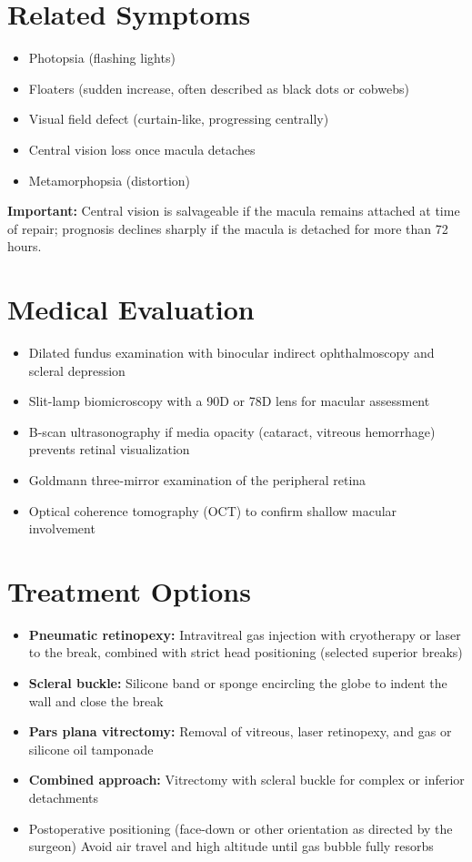 \section*{Related Symptoms}
\begin{itemize}
  \item Photopsia (flashing lights)
  \item Floaters (sudden increase, often described as black dots or cobwebs)
  \item Visual field defect (curtain-like, progressing centrally)
  \item Central vision loss once macula detaches
  \item Metamorphopsia (distortion)
\end{itemize}
\textbf{Important:} Central vision is salvageable if the macula remains attached at time of repair; prognosis declines sharply if the macula is detached for more than 72 hours.

\section*{Medical Evaluation}
\begin{itemize}
  \item Dilated fundus examination with binocular indirect ophthalmoscopy and scleral depression
  \item Slit-lamp biomicroscopy with a 90D or 78D lens for macular assessment
  \item B-scan ultrasonography if media opacity (cataract, vitreous hemorrhage) prevents retinal visualization
  \item Goldmann three-mirror examination of the peripheral retina
  \item Optical coherence tomography (OCT) to confirm shallow macular involvement
\end{itemize}

\section*{Treatment Options}
\begin{itemize}
  \item \textbf{Pneumatic retinopexy:} Intravitreal gas injection with cryotherapy or laser to the break, combined with strict head positioning (selected superior breaks)
  \item \textbf{Scleral buckle:} Silicone band or sponge encircling the globe to indent the wall and close the break
  \item \textbf{Pars plana vitrectomy:} Removal of vitreous, laser retinopexy, and gas or silicone oil tamponade
  \item \textbf{Combined approach:} Vitrectomy with scleral buckle for complex or inferior detachments
  \item Postoperative positioning (face-down or other orientation as directed by the surgeon)
  \textit{} Avoid air travel and high altitude until gas bubble fully resorbs
\end{itemize}

